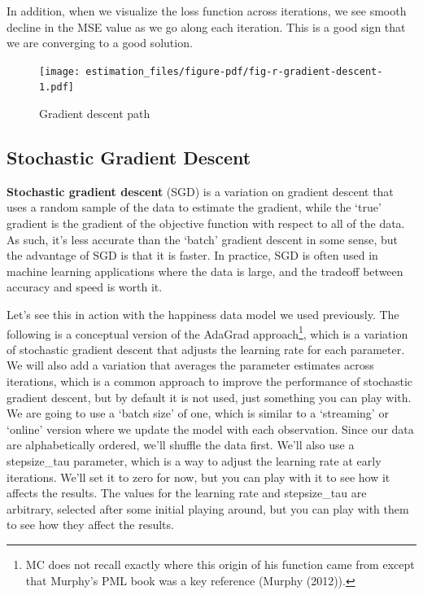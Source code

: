 \documentclass[
  letterpaper,
]{krantz}
\begin{document}
In addition, when we visualize the loss function across iterations, we
see smooth decline in the MSE value as we go along each iteration. This
is a good sign that we are converging to a good solution.

\begin{figure}

{\centering \texttt{[image: estimation\_files/figure-pdf/fig-r-gradient-descent-1.pdf]}

}

\caption{\label{fig-r-gradient-descent}Gradient descent path}

\end{figure}

\subsection{Stochastic Gradient Descent}\label{sec-estim-opt-algos-sgd}

\textbf{Stochastic gradient descent} (SGD) is a variation on gradient
descent that uses a random sample of the data to estimate the gradient,
while the `true' gradient is the gradient of the objective function with
respect to all of the data. As such, it's less accurate than the `batch'
gradient descent in some sense, but the advantage of SGD is that it is
faster. In practice, SGD is often used in machine learning applications
where the data is large, and the tradeoff between accuracy and speed is
worth it.

Let's see this in action with the happiness data model we used
previously. The following is a conceptual version of the AdaGrad
approach\footnote{MC does not recall exactly where this origin of his
  function came from except that Murphy's PML book was a key reference
  (Murphy (2012)).}, which is a variation of stochastic gradient descent
that adjusts the learning rate for each parameter. We will also add a
variation that averages the parameter estimates across iterations, which
is a common approach to improve the performance of stochastic gradient
descent, but by default it is not used, just something you can play
with. We are going to use a `batch size' of one, which is similar to a
`streaming' or `online' version where we update the model with each
observation. Since our data are alphabetically ordered, we'll shuffle
the data first. We'll also use a stepsize\_tau parameter, which is a way
to adjust the learning rate at early iterations. We'll set it to zero
for now, but you can play with it to see how it affects the results. The
values for the learning rate and stepsize\_tau are arbitrary, selected
after some initial playing around, but you can play with them to see how
they affect the results.
\end{document}
